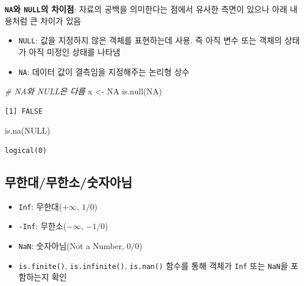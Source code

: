\documentclass[
  11pt,
]{krantz}
\makeatletter
\newenvironment{Shaded}{\begin{snugshade}}{\end{snugshade}}
\newcommand{\CommentTok}[1]{\textcolor[rgb]{0.37,0.37,0.37}{\textit{#1}}}
\newcommand{\ConstantTok}[1]{\textcolor[rgb]{0,0,0}{#1}}
\newcommand{\FunctionTok}[1]{\textcolor[rgb]{0,0,0}{#1}}
\newcommand{\NormalTok}[1]{#1}
\newcommand{\OtherTok}[1]{\textcolor[rgb]{0.37,0.37,0.37}{#1}}
\providecommand{\tightlist}{%
  \setlength{\itemsep}{0pt}\setlength{\parskip}{0pt}}
\newenvironment{kframe}{%
\medskip{}
\setlength{\fboxsep}{.8em}
 \def\at@end@of@kframe{}%
 \ifinner\ifhmode%
  \def\at@end@of@kframe{\end{minipage}}%
  \begin{minipage}{\columnwidth}%
 \fi\fi%
 \def\FrameCommand##1{\hskip\@totalleftmargin \hskip-\fboxsep
 \colorbox{shadecolor}{##1}\hskip-\fboxsep
     \hskip-\linewidth \hskip-\@totalleftmargin \hskip\columnwidth}%
 \MakeFramed {\advance\hsize-\width
   \@totalleftmargin\z@ \linewidth\hsize
   \@setminipage}}%
 {\par\unskip\endMakeFramed%
 \at@end@of@kframe}
\newenvironment{rmdblock}[1]
  {
  \begin{itemize}
  \renewcommand{\labelitemi}{
    \raisebox{-.7\height}[0pt][0pt]{
      {\setkeys{Gin}{width=3em,keepaspectratio}\texttt{[image: images/\#1]}}
    }
  }
  \setlength{\fboxsep}{1em}
  \begin{kframe}
  \item
  }
  {
  \end{kframe}
  \end{itemize}
  }
\newenvironment{rmdnote}
  {\begin{rmdblock}{note}}
  {\end{rmdblock}}
\makeatother
\begin{document}
\begin{rmdnote}
\textbf{\texttt{NA}와 \texttt{NULL}의 차이점}: 자료의 공백을 의미한다는 점에서 유사한 측면이 있으나 아래 내용처럼 큰 차이가 있음

\begin{itemize}
\tightlist
\item
  \texttt{NULL}: 값을 지정하지 않은 객체를 표현하는데 사용. 즉 아직 변수 또는 객체의 상태가 아직 미정인 상태를 나타냄
\item
  \texttt{NA}: 데이터 값이 결측임을 지정해주는 논리형 상수
\end{itemize}
\end{rmdnote}

\normalsize

\footnotesize

\begin{Shaded}
\begin{Highlighting}[]
\CommentTok{\# NA와 NULL은 다름}
\NormalTok{x }\OtherTok{\textless{}{-}} \ConstantTok{NA}
\FunctionTok{is.null}\NormalTok{(}\ConstantTok{NA}\NormalTok{)}
\end{Highlighting}
\end{Shaded}

\begin{verbatim}
[1] FALSE
\end{verbatim}

\begin{Shaded}
\begin{Highlighting}[]
\FunctionTok{is.na}\NormalTok{(}\ConstantTok{NULL}\NormalTok{)}
\end{Highlighting}
\end{Shaded}

\begin{verbatim}
logical(0)
\end{verbatim}

\normalsize

\hypertarget{finite}{%
\subsection{무한대/무한소/숫자아님}\label{finite}}

\begin{itemize}
\tightlist
\item
  \texttt{Inf}: 무한대(\(+\infty\), \(1/0\))
\item
  \texttt{-Inf}: 무한소(\(-\infty\), \(-1/0\))
\item
  \texttt{NaN}: 숫자아님(Not a Number, \(0/0\))
\item
  \texttt{is.finite()}, \texttt{is.infinite()}, \texttt{is.nan()} 함수를 통해 객체가 \texttt{Inf} 또는 \texttt{NaN}을 포함하는지 확인
\end{itemize}
\end{document}
